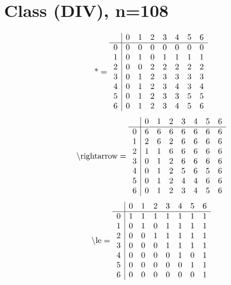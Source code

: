 \documentclass[11pt]{article}
\begin{document}
\section{Class (DIV), n=108}
\[\text{*} = 
\begin{array}{r | r r r r r r r}
 & 0 & 1 & 2 & 3 & 4 & 5 & 6 \\ \hline
0 & 0 & 0 & 0 & 0 & 0 & 0 & 0 \\
1 & 0 & 1 & 0 & 1 & 1 & 1 & 1 \\
2 & 0 & 0 & 2 & 2 & 2 & 2 & 2 \\
3 & 0 & 1 & 2 & 3 & 3 & 3 & 3 \\
4 & 0 & 1 & 2 & 3 & 4 & 3 & 4 \\
5 & 0 & 1 & 2 & 3 & 3 & 5 & 5 \\
6 & 0 & 1 & 2 & 3 & 4 & 5 & 6 \\
\end{array}
\]
\[\text{\textbackslash rightarrow} = 
\begin{array}{r | r r r r r r r}
 & 0 & 1 & 2 & 3 & 4 & 5 & 6 \\ \hline
0 & 6 & 6 & 6 & 6 & 6 & 6 & 6 \\
1 & 2 & 6 & 2 & 6 & 6 & 6 & 6 \\
2 & 1 & 1 & 6 & 6 & 6 & 6 & 6 \\
3 & 0 & 1 & 2 & 6 & 6 & 6 & 6 \\
4 & 0 & 1 & 2 & 5 & 6 & 5 & 6 \\
5 & 0 & 1 & 2 & 4 & 4 & 6 & 6 \\
6 & 0 & 1 & 2 & 3 & 4 & 5 & 6 \\
\end{array}
\]
\[\text{\textbackslash le} = 
\begin{array}{r | r r r r r r r}
 & 0 & 1 & 2 & 3 & 4 & 5 & 6 \\ \hline
0 & 1 & 1 & 1 & 1 & 1 & 1 & 1 \\
1 & 0 & 1 & 0 & 1 & 1 & 1 & 1 \\
2 & 0 & 0 & 1 & 1 & 1 & 1 & 1 \\
3 & 0 & 0 & 0 & 1 & 1 & 1 & 1 \\
4 & 0 & 0 & 0 & 0 & 1 & 0 & 1 \\
5 & 0 & 0 & 0 & 0 & 0 & 1 & 1 \\
6 & 0 & 0 & 0 & 0 & 0 & 0 & 1 \\
\end{array}
\]
\end{document}
